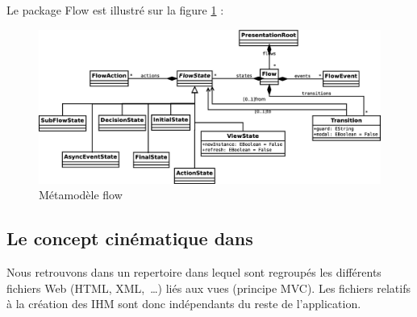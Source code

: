 \begin{itemize}
Le package Flow est illustré sur la figure \ref{fig:flow} :

\begin{figure}[H]
  \centering
  \includegraphics[scale=.3]{img/flow.eps}
  \caption{Métamodèle flow}
  \label{fig:flow}
\end{figure}

\end{itemize}


\subsection{Le concept cinématique dans \kwplay{}}
Nous retrouvons dans \kwplay{} un repertoire dans lequel sont regroupés les différents fichiers Web (HTML, XML,~\dots) liés aux vues (principe MVC). Les fichiers relatifs à la création des \textsc{IHM} sont donc indépendants du reste de l'application.   

